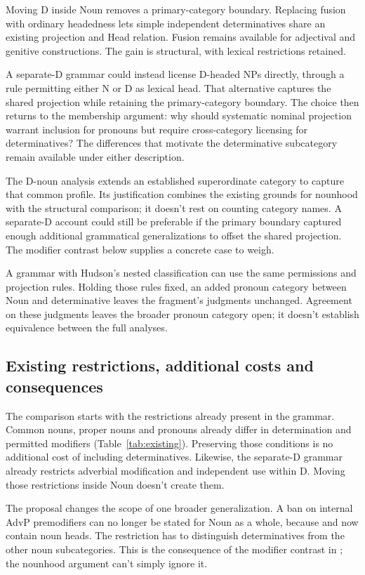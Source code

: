 \documentclass[12pt]{article}
\begin{document}
Moving D inside Noun removes a primary-category boundary. Replacing fusion with ordinary headedness lets simple independent determinatives share an existing projection and Head relation. Fusion remains available for adjectival and genitive constructions. The gain is structural, with lexical restrictions retained.

A separate-D grammar could instead license D-headed NPs directly, through a rule permitting either N or D as lexical head. That alternative captures the shared projection while retaining the primary-category boundary. The choice then returns to the membership argument: why should systematic nominal projection warrant inclusion for pronouns but require cross-category licensing for determinatives? The differences that motivate the determinative subcategory remain available under either description.

The D-noun analysis extends an established superordinate category to capture that common profile. Its justification combines the existing grounds for nounhood with the structural comparison; it doesn't rest on counting category names. A separate-D account could still be preferable if the primary boundary captured enough additional grammatical generalizations to offset the shared projection. The modifier contrast below supplies a concrete case to weigh.

A grammar with Hudson's nested classification can use the same permissions and projection rules. Holding those rules fixed, an added pronoun category between Noun and determinative leaves the fragment's judgments unchanged. Agreement on these judgments leaves the broader pronoun category open; it doesn't establish equivalence between the full analyses.

\subsection{Existing restrictions, additional costs and consequences}\label{sec:costs}

The comparison starts with the restrictions already present in the grammar. Common nouns, proper nouns and pronouns already differ in determination and permitted modifiers (Table~\ref{tab:existing}). Preserving those conditions is no additional cost of including determinatives. Likewise, the separate-D grammar already restricts adverbial modification and independent use within D. Moving those restrictions inside Noun doesn't create them.

The proposal changes the scope of one broader generalization. A ban on internal AdvP premodifiers can no longer be stated for Noun as a whole, because  and  now contain noun heads. The restriction has to distinguish determinatives from the other noun subcategories. This is the consequence of the modifier contrast in \textcite[40--42]{payne2010}; the nounhood argument can't simply ignore it.
\end{document}

